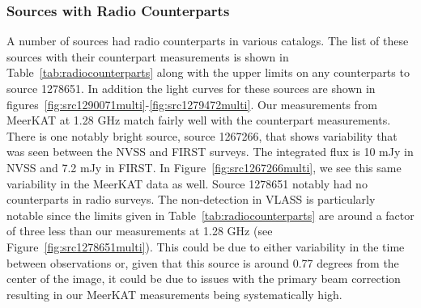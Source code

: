 \documentclass[12pt]{article}
\begin{document}
\subsubsection{Sources with Radio Counterparts}
A number of sources had radio counterparts in various catalogs. The list of these sources with their counterpart measurements is shown in Table~\ref{tab:radiocounterparts} along with the upper limits on any counterparts to source 1278651. In addition the light curves for these sources are shown in figures~\ref{fig:src1290071multi}-\ref{fig:src1279472multi}. Our measurements from MeerKAT at 1.28 GHz match fairly well with the counterpart measurements. There is one notably bright source, source 1267266, that shows variability that was seen between the NVSS and FIRST surveys. The integrated flux is 10 mJy in NVSS and 7.2 mJy in FIRST. In Figure~\ref{fig:src1267266multi}, we see this same variability in the MeerKAT data as well. Source 1278651 notably had no counterparts in radio surveys. The non-detection in VLASS is particularly notable since the limits given in Table~\ref{tab:radiocounterparts} are around a factor of three less than our measurements at 1.28 GHz (see Figure~\ref{fig:src1278651multi}). This could be due to either variability in the time between observations or, given that this source is around 0.77 degrees from the center of the image, it could be due to issues with the primary beam correction resulting in our MeerKAT measurements being systematically high.
\end{document}
